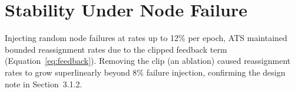 \section{Stability Under Node Failure}

Injecting random node failures at rates up to 12\% per epoch, ATS
maintained bounded reassignment rates due to the clipped feedback term
(Equation~\ref{eq:feedback}). Removing the clip (an ablation) caused
reassignment rates to grow superlinearly beyond 8\% failure injection,
confirming the design note in Section~3.1.2.

